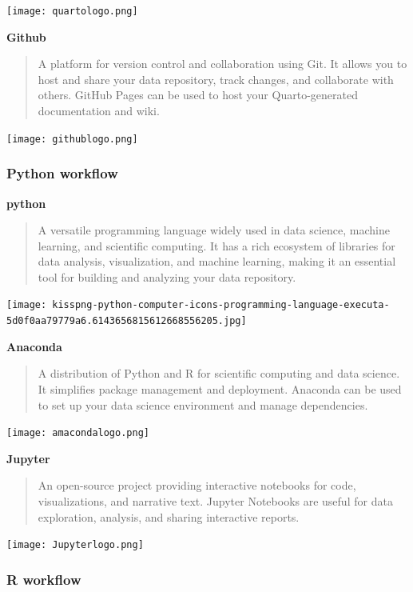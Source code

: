 \documentclass[
  letterpaper,
  DIV=11,
  numbers=noendperiod]{scrartcl}
\begin{document}
\texttt{[image: quartologo.png]}

\textbf{Github}

\begin{quote}
A platform for version control and collaboration using Git. It allows
you to host and share your data repository, track changes, and
collaborate with others. GitHub Pages can be used to host your
Quarto-generated documentation and wiki.
\end{quote}

\texttt{[image: githublogo.png]}

\subsubsection{Python workflow}\label{python-workflow}

\textbf{python}

\begin{quote}
A versatile programming language widely used in data science, machine
learning, and scientific computing. It has a rich ecosystem of libraries
for data analysis, visualization, and machine learning, making it an
essential tool for building and analyzing your data repository.
\end{quote}

\texttt{[image: kisspng-python-computer-icons-programming-language-executa-5d0f0aa79779a6.6143656815612668556205.jpg]}

\textbf{Anaconda}

\begin{quote}
A distribution of Python and R for scientific computing and data
science. It simplifies package management and deployment. Anaconda can
be used to set up your data science environment and manage dependencies.
\end{quote}

\texttt{[image: amacondalogo.png]}

\textbf{Jupyter}

\begin{quote}
An open-source project providing interactive notebooks for code,
visualizations, and narrative text. Jupyter Notebooks are useful for
data exploration, analysis, and sharing interactive reports.
\end{quote}

\texttt{[image: Jupyterlogo.png]}

\subsubsection{R workflow}\label{r-workflow}
\end{document}
